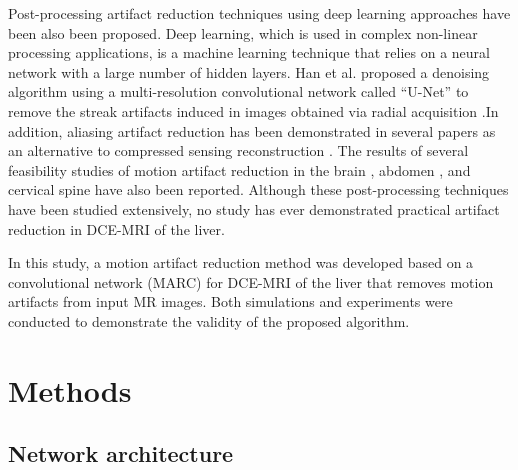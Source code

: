 \documentclass[num-refs]{wiley-article}
\begin{document}
Post-processing artifact reduction techniques using deep learning approaches have been also been proposed. Deep learning, which is used in complex non-linear processing applications, is a machine learning technique that relies on a neural network with a large number of hidden layers. Han et al. proposed a denoising algorithm using a multi-resolution convolutional network called “U-Net” to remove the streak artifacts induced in images obtained via radial acquisition \cite{han2018deep}.In addition, aliasing artifact reduction has been demonstrated in several papers as an alternative to compressed sensing reconstruction \cite{lee2017deep}\cite{yang2018dagan}\cite{hyun2018deep}. The results of several feasibility studies of motion artifact reduction in the brain \cite{Karsten2018ismrm}\cite{Patricia2018ismrm}\cite{Kamlesh2018ismrm}, abdomen \cite{Daiki2018ismrm}, and cervical spine \cite{Hongpyo2018ismrm} have also been reported. Although these post-processing techniques have been studied extensively, no study has ever demonstrated practical artifact reduction in DCE-MRI of the liver.


In this study, a motion artifact reduction method was developed based on a convolutional network (MARC) for DCE-MRI of the liver that removes motion artifacts from input MR images. Both simulations and experiments were conducted to demonstrate the validity of the proposed algorithm.



\section{Methods}



\subsection{Network architecture}
\end{document}
